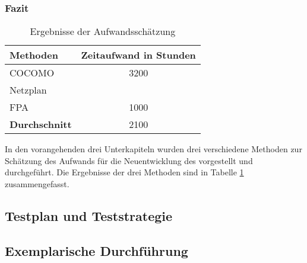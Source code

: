 \subsubsection{Fazit}
\begin{table}[H]
  \centering
  \begin{tabular}{|l|c|}
    \hline
    \textbf{Methoden} & \textbf{Zeitaufwand} in Stunden \\
    \hline
    \ac{COCOMO} & 3200 \\
    \hline
    Netzplan &  \\
    \hline
    \ac{FPA} & 1000 \\
    \hline
    \textbf{Durchschnitt} & 2100 \\
    \hline
  \end{tabular}
  \caption{Ergebnisse der Aufwandsschätzung}
  \label{tab:aufwandsschaetzungErgebnisse}
\end{table}
In den vorangehenden drei Unterkapiteln wurden drei verschiedene Methoden zur Schätzung des Aufwands für die Neuentwicklung des  vorgestellt und durchgeführt.
Die Ergebnisse der drei Methoden sind in Tabelle \ref{tab:aufwandsschaetzungErgebnisse} zusammengefasst.

\subsection{Testplan und Teststrategie}

\subsection{Exemplarische Durchführung}
